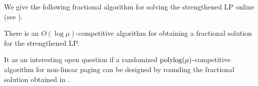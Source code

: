 \documentclass[11pt]{article}
\begin{document}
We give the following fractional algorithm for solving the strengthened LP online (see ). %

\begin{theorem}
	\label{thm:MU}
	There is an $O\left(\log \mu\right)$-competitive algorithm for obtaining a fractional solution for the strengthened \textnormal{LP}. %
\end{theorem}

It as an interesting open question if a randomized $\textnormal{polylog}(\mu)$-competitive algorithm for non-linear paging can be designed by rounding the fractional solution obtained in .








 

%
\end{document}
